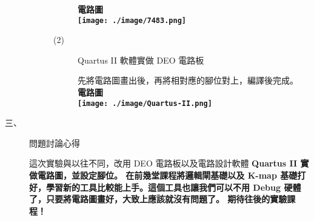 \documentclass[12pt, a4paper]{article}
\begin{document}
\begin{description}
\begin{description}
\begin{description}
                  \bf {電路圖} \\             
                  \texttt{[image: ./image/7483.png]}
                  \normalfont
              \item [(2)] Quartus II 軟體實做 DEO 電路板 \\[6cm]
              
              \begin{minipage}{\linewidth}
                \normalfont
                先將電路圖畫出後，再將相對應的腳位對上，編譯後完成。\\
                \bf{電路圖} \\[.4cm]
                \texttt{[image: ./image/Quartus-II.png]}
              \end{minipage}
              
            \end{description}
          \normalsize  
        \normalsize
      \end{description}
    \item [三、]問題討論心得 \\[.6cm]
      \begin{minipage}[t]{\linewidth}
        \fontsize{16}{18}\selectfont
          這次實驗與以往不同，改用 DEO 電路板以及電路設計軟體 \bf{Quartus II} \normalfont 實做電路圖，並設定腳位。
          在前幾堂課程將邏輯閘基礎以及 K-map 基礎打好，學習新的工具比較能上手。這個工具也讓我們可以不用 Debug 硬體了，只要將電路圖畫好，大致上應該就沒有問題了。
          期待往後的實驗課程！
        \normalsize  
      \end{minipage}
  \normalsize
\end{description}
\end{document}
